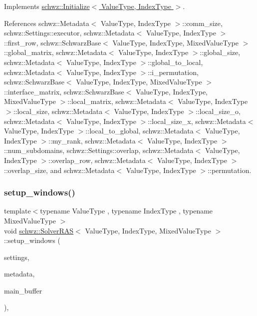 Implements \hyperlink{classschwz_1_1Initialize_ad24764a4ded54c2af6a5111ba8c8228f}{schwz\+::\+Initialize$<$ Value\+Type, Index\+Type $>$}.



References schwz\+::\+Metadata$<$ Value\+Type, Index\+Type $>$\+::comm\+\_\+size, schwz\+::\+Settings\+::executor, schwz\+::\+Metadata$<$ Value\+Type, Index\+Type $>$\+::first\+\_\+row, schwz\+::\+Schwarz\+Base$<$ Value\+Type, Index\+Type, Mixed\+Value\+Type $>$\+::global\+\_\+matrix, schwz\+::\+Metadata$<$ Value\+Type, Index\+Type $>$\+::global\+\_\+size, schwz\+::\+Metadata$<$ Value\+Type, Index\+Type $>$\+::global\+\_\+to\+\_\+local, schwz\+::\+Metadata$<$ Value\+Type, Index\+Type $>$\+::i\+\_\+permutation, schwz\+::\+Schwarz\+Base$<$ Value\+Type, Index\+Type, Mixed\+Value\+Type $>$\+::interface\+\_\+matrix, schwz\+::\+Schwarz\+Base$<$ Value\+Type, Index\+Type, Mixed\+Value\+Type $>$\+::local\+\_\+matrix, schwz\+::\+Metadata$<$ Value\+Type, Index\+Type $>$\+::local\+\_\+size, schwz\+::\+Metadata$<$ Value\+Type, Index\+Type $>$\+::local\+\_\+size\+\_\+o, schwz\+::\+Metadata$<$ Value\+Type, Index\+Type $>$\+::local\+\_\+size\+\_\+x, schwz\+::\+Metadata$<$ Value\+Type, Index\+Type $>$\+::local\+\_\+to\+\_\+global, schwz\+::\+Metadata$<$ Value\+Type, Index\+Type $>$\+::my\+\_\+rank, schwz\+::\+Metadata$<$ Value\+Type, Index\+Type $>$\+::num\+\_\+subdomains, schwz\+::\+Settings\+::overlap, schwz\+::\+Metadata$<$ Value\+Type, Index\+Type $>$\+::overlap\+\_\+row, schwz\+::\+Metadata$<$ Value\+Type, Index\+Type $>$\+::overlap\+\_\+size, and schwz\+::\+Metadata$<$ Value\+Type, Index\+Type $>$\+::permutation.

\mbox{\label{classschwz_1_1SolverRAS_adc313354f7ae256d375316516d0f655e}} 
\subsubsection{\texorpdfstring{setup\+\_\+windows()}{setup\_windows()}}
{\footnotesize\ttfamily template$<$typename Value\+Type , typename Index\+Type , typename Mixed\+Value\+Type $>$ \\
void \hyperlink{classschwz_1_1SolverRAS}{schwz\+::\+Solver\+R\+AS}$<$ Value\+Type, Index\+Type, Mixed\+Value\+Type $>$\+::setup\+\_\+windows (\begin{DoxyParamCaption}\item[{const \hyperlink{structschwz_1_1Settings}{Settings} \&}]{settings,  }\item[{const \hyperlink{structschwz_1_1Metadata}{Metadata}$<$ Value\+Type, Index\+Type $>$ \&}]{metadata,  }\item[{std\+::shared\+\_\+ptr$<$ gko\+::matrix\+::\+Dense$<$ Value\+Type $>$$>$ \&}]{main\+\_\+buffer }\end{DoxyParamCaption})\hspace{0.3cm}{\ttfamily [override]}, {\ttfamily [virtual]}}



